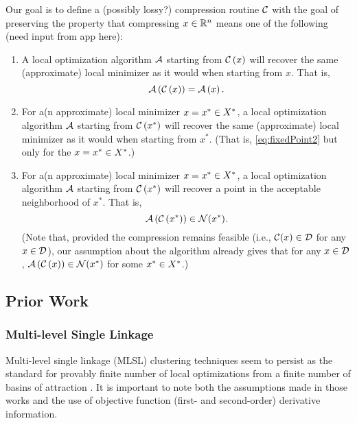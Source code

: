 Our goal is to define a (possibly lossy?) compression routine $\mathcal{C}$ 
with the goal of preserving the property that compressing $x\in \mathbb{R}^n$ means 
one of the following (need input from app here):
\begin{enumerate}
 \item A local optimization algorithm $\mathcal{A}$ starting from $\mathcal{C} 
\left( x \right)$ will recover the same (approximate) 
local minimizer as it would when starting from $x$. That is,
\begin{equation}
 \mathcal{A} \left( \mathcal{C} \left( x \right) \right) =   \mathcal{A} \left( x \right).
 \label{eq:fixedPoint2}
\end{equation}

\item For a(n approximate) local minimizer $x=x^*\in X^*$, a local optimization 
algorithm $\mathcal{A}$ starting from $\mathcal{C} 
\left( x^* \right)$ will recover the same (approximate) 
local minimizer as it would when starting from $x^*$. (That is, 
\eqref{eq:fixedPoint2} but only for the $x=x^*\in X^*$.)

\item For a(n approximate) local minimizer $x=x^*\in X^*$, a local optimization 
algorithm $\mathcal{A}$ starting from $\mathcal{C} 
\left( x^* \right)$ will recover a point in the acceptable 
neighborhood of $x^*$. That is,
\begin{equation}
 \mathcal{A} \left( \mathcal{C} \left( x^* \right) \right) \in \mathcal{N}(x^*).
 \label{eq:fixedPoint}
\end{equation}
(Note that, provided the compression remains feasible (i.e., $\mathcal{C}(x)\in \mathcal{D}$ 
for any $x\in \mathcal{D}$), our assumption about the algorithm already gives that for 
any $x\in \mathcal{D}$, $\mathcal{A} \left( \mathcal{C} \left( x \right) \right) \in \mathcal{N}(x^*)$ for some 
$x^*\in X^*$.)
\end{enumerate}

\subsection{Prior Work}

\subsubsection{Multi-level Single Linkage}

Multi-level single linkage (MLSL) clustering techniques seem to persist as the 
standard for provably finite number of local optimizations from a finite 
number of basins of attraction \cite{Kan1987,Kan1987b}. It is important 
to note both the assumptions made in those works and the use of 
objective function (first- and second-order) derivative 
information. 

